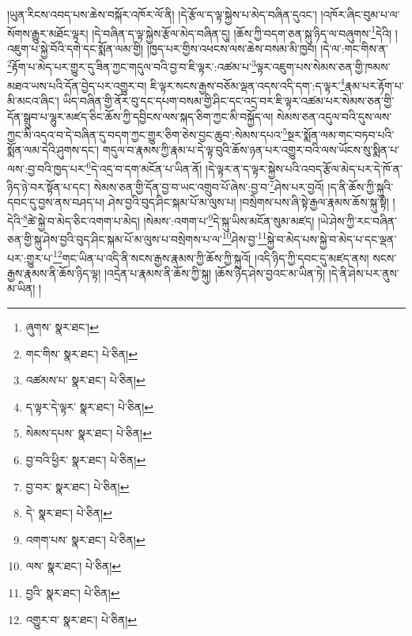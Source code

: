 །ཡུན་རིངས་འབད་པས་ཆེས་བསྐོར་འཁོར་ལོ་ནི། །དེ་རྩོལ་ད་ལྟ་སྐྱེས་པ་མེད་བཞིན་དུའང་། །འཁོར་ཞིང་བུམ་པ་ལ་སོགས་རྒྱུར་མཐོང་ལྟར། །དེ་བཞིན་ད་ལྟ་སྐྱེས་རྩོལ་མེད་བཞིན་དུ། །ཆོས་ཀྱི་བདག་ཅན་སྐུ་ཉིད་ལ་བཞུགས་\footnote{ཞུགས་  སྣར་ཐང་། }དེའི། །འཇུག་པ་སྐྱེ་བོའི་དགེ་དང་སྨོན་ལམ་གྱི། །ཁྱད་པར་གྱིས་འཕངས་ལས་ཆེས་བསམ་མི་ཁྱབ། །དེ་ལ་:གང་གིས་ན་\footnote{གང་གིས་  སྣར་ཐང་།  པེ་ཅིན། }རྟོག་པ་མེད་པར་གྱུར་དུ་ཟིན་ཀྱང་གདུལ་བའི་བྱ་བ་ཇི་ལྟར་:འཚམ་པ་\footnote{འཚམས་པ་  སྣར་ཐང་།  པེ་ཅིན། }ལྟར་འཇུག་པས་སེམས་ཅན་གྱི་ཁམས་མཐའ་ཡས་པའི་དོན་བྱེད་པར་འགྱུར་བ། ཇི་ལྟར་སངས་རྒྱས་བཅོམ་ལྡན་འདས་འདི་དག་:ད་ལྟར་\footnote{ད་ལྟར་དེ་ལྟར་  སྣར་ཐང་།  པེ་ཅིན། }རྣམ་པར་རྟོག་པ་མི་མངའ་ཞིང་། ཡིད་བཞིན་གྱི་ནོར་བུ་དང་དཔག་བསམ་གྱི་ཤིང་དང་འདྲ་བར་ཇི་ལྟར་འཚམ་པར་སེམས་ཅན་གྱི་དོན་སྒྲུབ་པ་ལྷུར་མཛད་ཅིང་ཆོས་ཀྱི་དབྱིངས་ལས་སྐད་ཅིག་ཀྱང་མི་བསྐྱོད་ལ། སེམས་ཅན་འདུལ་བའི་དུས་ལས་ཀྱང་མི་འདའ་བ་དེ་བཞིན་དུ་བདག་ཀྱང་གྱུར་ཅིག་ཅེས་བྱང་ཆུབ་:སེམས་དཔའ་\footnote{སེམས་དཔས་  སྣར་ཐང་།  པེ་ཅིན། }སྔར་སྨོན་ལམ་གང་བཏབ་པའི་སྨོན་ལམ་དེའི་ཤུགས་དང་། གདུལ་བ་རྣམས་ཀྱི་རྣམ་པ་དེ་ལྟ་བུའི་ཆོས་ཉན་པར་འགྱུར་བའི་ལས་ཡོངས་སུ་སྨིན་པ་ལས་:བྱ་བའི་ཁྱད་པར་\footnote{བྱ་བའི་ཕྱིར་  སྣར་ཐང་།  པེ་ཅིན། }དེ་འདྲ་བ་དག་མངོན་པ་ཡིན་ནོ། །དེ་ལྟར་ན་ད་ལྟར་སྐྱེས་པའི་འབད་རྩོལ་མེད་པར་དེ་ཁོ་ན་ཉིད་ཉེ་བར་སྟོན་པ་དང་། སེམས་ཅན་གྱི་དོན་བྱ་བ་ཡང་འགྲུབ་པོ་ཞེས་:བྱ་བ་\footnote{བྱ་བར་  སྣར་ཐང་།  པེ་ཅིན། }ཤེས་པར་བྱའོ། །ད་ནི་ཆོས་ཀྱི་སྐུའི་དབང་དུ་བྱས་ནས་བཤད་པ། ཤེས་བྱའི་བུད་ཤིང་སྐམ་པོ་མ་ལུས་པ། །བསྲེགས་པས་ཞི་སྟེ་རྒྱལ་རྣམས་ཆོས་སྐུ་སྟེ། །དེའི་\footnote{དེ་  སྣར་ཐང་།  པེ་ཅིན། }ཚེ་སྐྱེ་བ་མེད་ཅིང་འགག་པ་མེད། །སེམས་:འགག་པ་\footnote{འགག་པས་  སྣར་ཐང་།  པེ་ཅིན། }དེ་སྐུ་ཡིས་མངོན་སུམ་མཛད། །ཡེ་ཤེས་ཀྱི་རང་བཞིན་ཅན་གྱི་སྐུ་ཤེས་བྱའི་བུད་ཤིང་སྐམ་པོ་མ་ལུས་པ་བསྲེགས་པ་ལ་\footnote{ལས་  སྣར་ཐང་།  པེ་ཅིན། }ཤེས་བྱ་\footnote{བྱའི་  སྣར་ཐང་།  པེ་ཅིན། }སྐྱེ་བ་མེད་པས་སྐྱེ་བ་མེད་པ་དང་ལྡན་པར་:གྱུར་པ་\footnote{འགྱུར་བ་  སྣར་ཐང་།  པེ་ཅིན། }གང་ཡིན་པ་འདི་ནི་སངས་རྒྱས་རྣམས་ཀྱི་ཆོས་ཀྱི་སྐུའོ། །འདི་ཉིད་ཀྱི་དབང་དུ་མཛད་ནས། སངས་རྒྱས་རྣམས་ནི་ཆོས་ཉིད་ལྟ། །འདྲེན་པ་རྣམས་ནི་ཆོས་ཀྱི་སྐུ། །ཆོས་ཉིད་ཤེས་བྱའང་མ་ཡིན་ཏེ། །དེ་ནི་ཤེས་པར་ནུས་མ་ཡིན། །
